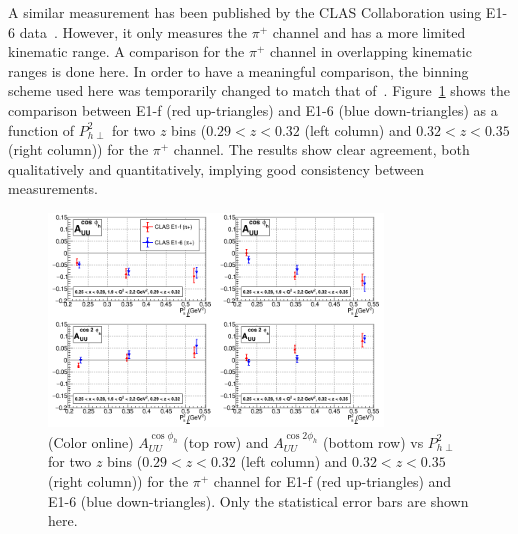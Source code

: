 \documentclass[aps,prl,twocolumn,showpacs,superscriptaddress,groupedaddress]{revtex4}  %
\newcommand{\Phperp}{P_{h\perp}}
\begin{document}
A similar measurement has been published by the CLAS Collaboration using \mbox{E1-6} data~\cite{Osipenko:2008rv}.
However, it only measures the $\pi^+$ channel and has a more limited kinematic range.
A comparison for the $\pi^+$ channel in overlapping kinematic ranges is done here.
In order to have a meaningful comparison, the binning scheme used here was temporarily changed to match that of~\cite{Osipenko:2008rv}.
Figure~\ref{fig:osipenkoComparisonVPT2_2zBins} shows the comparison between E1-f (red up-triangles) and E1-6 (blue down-triangles) as a function of $\Phperp^2$ for two $z$ bins ($0.29 < z < 0.32$ (left column) and $0.32 < z < 0.35$ (right column)) for the $\pi^+$ channel.
The results show clear agreement, both qualitatively and quantitatively, implying good consistency between measurements.
%
\begin{figure}[htp]
\centering
\includegraphics[width=3.5in]{plots/osipenkoComparisonVPT2_2zBins.png}
\caption{(Color online) $A_{UU}^{\cos \phi_h}$ (top row) and $A_{UU}^{\cos 2\phi_h}$ (bottom row) vs $P_{h\perp}^2$ for two $z$ bins ($0.29 < z < 0.32$ (left column) and $0.32 < z < 0.35$ (right column)) for the $\pi^+$ channel for E1-f (red up-triangles) and E1-6 (blue down-triangles). Only the statistical error bars are shown here.}
\label{fig:osipenkoComparisonVPT2_2zBins}
\end{figure}
\end{document}

